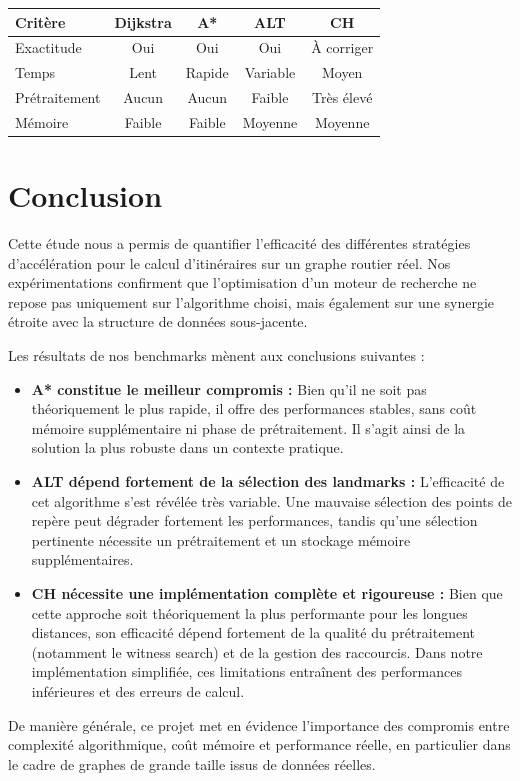 \documentclass[11pt]{article}
\begin{document}
{\large
\renewcommand{\arraystretch}{1.2}
\begin{center}
\begin{tabular}{lcccc}
\hline
Critère & Dijkstra & A* & ALT & CH \\
\hline
Exactitude & Oui & Oui & Oui & À corriger \\
Temps & Lent & Rapide & Variable & Moyen \\
Prétraitement & Aucun & Aucun & Faible & Très élevé \\
Mémoire & Faible & Faible & Moyenne & Moyenne \\
\hline
\end{tabular}
\end{center}
}

\section{Conclusion}

Cette étude nous a permis de quantifier l'efficacité des différentes stratégies d'accélération pour le calcul d'itinéraires sur un graphe routier réel. Nos expérimentations confirment que l'optimisation d'un moteur de recherche ne repose pas uniquement sur l'algorithme choisi, mais également sur une synergie étroite avec la structure de données sous-jacente.

Les résultats de nos benchmarks mènent aux conclusions suivantes :

\begin{itemize}

\item \textbf{A* constitue le meilleur compromis :}  
Bien qu'il ne soit pas théoriquement le plus rapide, il offre des performances stables, sans coût mémoire supplémentaire ni phase de prétraitement. Il s'agit ainsi de la solution la plus robuste dans un contexte pratique.

\item \textbf{ALT dépend fortement de la sélection des landmarks :}  
L'efficacité de cet algorithme s'est révélée très variable. Une mauvaise sélection des points de repère peut dégrader fortement les performances, tandis qu'une sélection pertinente nécessite un prétraitement et un stockage mémoire supplémentaires.

\item \textbf{CH nécessite une implémentation complète et rigoureuse :}  
Bien que cette approche soit théoriquement la plus performante pour les longues distances, son efficacité dépend fortement de la qualité du prétraitement (notamment le witness search) et de la gestion des raccourcis. Dans notre implémentation simplifiée, ces limitations entraînent des performances inférieures et des erreurs de calcul.

\end{itemize}

De manière générale, ce projet met en évidence l'importance des compromis entre complexité algorithmique, coût mémoire et performance réelle, en particulier dans le cadre de graphes de grande taille issus de données réelles.
\end{document}
